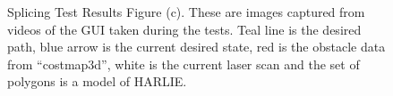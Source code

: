 \begin{figure}
\centering
\ContinuedFloat
{}
\caption[Splicing Test Results Figure (c)]{Splicing Test Results Figure (c). These are images captured from videos of the GUI taken during the tests. Teal line is the desired path, blue arrow is the current desired state, red is the obstacle data from ``costmap3d'', white is the current laser scan and the set of polygons is a model of HARLIE.}
\label{fig:splicing_test_results}
\end{figure}

